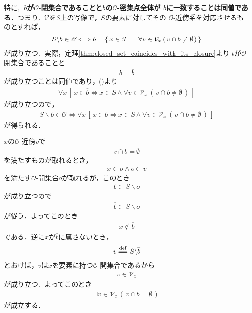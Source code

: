 	特に，{\bf $b$が$\mathscr{O}$-閉集合であることと$b$の$\mathscr{O}$-密集点全体が
	$b$に一致することは同値である．}つまり，$\mathcal{V}$を$S$上の写像で，$S$の要素に対してその
	$\mathscr{O}$-近傍系を対応させるものとすれば，
	\begin{align}
		S \backslash b \in \mathscr{O} \Longleftrightarrow
		b = \left\{\, x \in S \mid \quad \forall v \in \mathcal{V}_{x}\, (\, v \cap b \neq \emptyset\, )\, \right\}
	\end{align}
	が成り立つ．実際，定理\ref{thm:closed_set_coincides_with_its_closure}より
	$b$が$\mathscr{O}$-閉集合であることと
	\begin{align}
		b = \overline{b}
	\end{align}
	が成り立つことは同値であり，()より
	\begin{align}
		\forall x\, \left[\, x \in \overline{b} \Longleftrightarrow
		x \in S \wedge \forall v \in \mathcal{V}_{x}\, (\, v \cap b \neq \emptyset\, )\, \right]
	\end{align}
	が成り立つので，
	\begin{align}
		S \backslash b \in \mathscr{O} \Longleftrightarrow
		\forall x\, \left[\, x \in b \Longleftrightarrow
		x \in S \wedge \forall v \in \mathcal{V}_{x}\, (\, v \cap b \neq \emptyset\, )\, \right]
	\end{align}
	が得られる．
	
	\begin{sketch}
		$x$の$\mathscr{O}$-近傍$v$で
		\begin{align}
			v \cap b = \emptyset
		\end{align}
		を満たすものが取れるとき，
		\begin{align}
			x \subset o \wedge o \subset v
		\end{align}
		を満たす$\mathscr{O}$-開集合$o$が取れるが，このとき
		\begin{align}
			b \subset S \backslash o
		\end{align}
		が成り立つので
		\begin{align}
			\overline{b} \subset S \backslash o
		\end{align}
		が従う．よってこのとき
		\begin{align}
			x \notin \overline{b}
		\end{align}
		である．逆に$x$が$\overline{b}$に属さないとき，
		\begin{align}
			v \defeq S \backslash \overline{b}
		\end{align}
		とおけば，$v$は$x$を要素に持つ$\mathscr{O}$-開集合であるから
		\begin{align}
			v \in \mathcal{V}_{x}
		\end{align}
		が成り立つ．よってこのとき
		\begin{align}
			\exists v \in \mathcal{V}_{x}\, (\, v \cap b = \emptyset\, )
		\end{align}
		が成立する．
		\QED
	\end{sketch}
	
